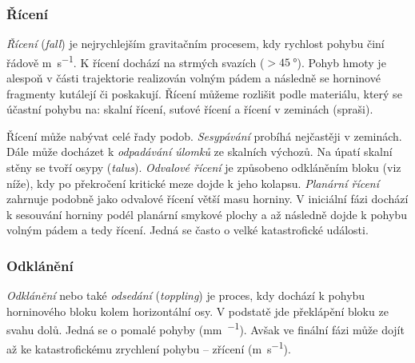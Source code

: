 
\subsubsection{Řícení}
\emph{Řícení} (\textit{fall}) je nejrychlejším gravitačním procesem, kdy rychlost pohybu činí řádově \si{\metre\per\second}. K řícení dochází na strmých svazích ($>\SI{45}{\degree}$). Pohyb hmoty je alespoň v části trajektorie realizován volným pádem a následně se horninové fragmenty kutálejí či poskakují. Řícení můžeme rozlišit podle materiálu, který se účastní pohybu na: skalní řícení, suťové řícení a řícení v zeminách (spraši).

Řícení může nabývat celé řady podob. \emph{Sesypávání} probíhá nejčastěji v zeminách. Dále může docházet k \emph{odpadávání úlomků} ze skalních výchozů. Na úpatí skalní stěny se tvoří osypy (\textit{talus}). \emph{Odvalové řícení} je způsobeno odkláněním bloku (viz níže), kdy po překročení kritické meze dojde k jeho kolapsu. \emph{Planární řícení} zahrnuje podobně jako odvalové řícení větší masu horniny. V iniciální fázi dochází k sesouvání horniny podél planární smykové plochy a až následně dojde k pohybu volným pádem a tedy řícení. Jedná se často o velké katastrofické události.

\subsubsection{Odklánění}
\emph{Odklánění} nebo také \emph{odsedání} (\textit{toppling}) je proces, kdy dochází k pohybu horninového bloku kolem horizontální osy. V podstatě jde překlápění bloku ze svahu dolů. Jedná se o pomalé pohyby (\si{\milli\metre\per\rok}). Avšak ve finální fázi může dojít až ke katastrofickému zrychlení pohybu -- zřícení (\si{\metre\per\second}).

